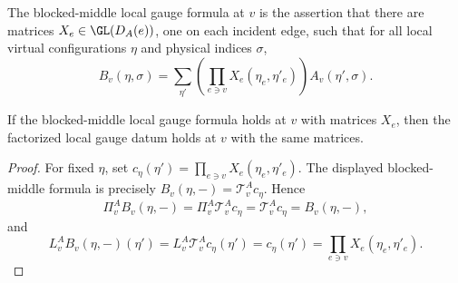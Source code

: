 \begin{definition}%
    \label{def:peps_blockedMiddleGaugeFormula}
    \leanok
    The blocked-middle local gauge formula at $v$ is the assertion that there
    are matrices $X_e\in\GL(D_A(e))$, one on each incident edge, such that for
    all local virtual configurations $\eta$ and physical indices $\sigma$,
    \[
        B_v(\eta,\sigma)
        =
        \sum_{\eta'}
        \left(\prod_{e\ni v}X_e(\eta_e,\eta'_e)\right)A_v(\eta',\sigma).
    \]
\end{definition}

\begin{theorem}%
    \label{thm:peps_hasFactorizedLocalGauge_of_blockedMiddleGaugeFormula}
    \leanok
    If the blocked-middle local gauge formula holds at $v$ with matrices
    $X_e$, then the factorized local gauge datum holds at $v$ with the same
    matrices.
\end{theorem}
\begin{proof}\leanok
    For fixed $\eta$, set
    $c_\eta(\eta')=\prod_{e\ni v}X_e(\eta_e,\eta'_e)$. The displayed
    blocked-middle formula is precisely
    $B_v(\eta,-)=\mathcal T^A_vc_\eta$. Hence
    \[
        \Pi^A_vB_v(\eta,-)
        =
        \Pi^A_v\mathcal T^A_vc_\eta
        =
        \mathcal T^A_vc_\eta
        =
        B_v(\eta,-),
    \]
    and
    \[
        L^A_vB_v(\eta,-)(\eta')
        =
        L^A_v\mathcal T^A_vc_\eta(\eta')
        =
        c_\eta(\eta')
        =
        \prod_{e\ni v}X_e(\eta_e,\eta'_e).
    \]
\end{proof}

